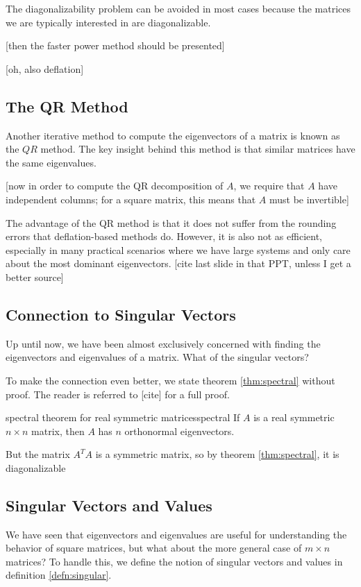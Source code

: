 \documentclass{article}
\begin{document}
The diagonalizability problem can be avoided in most cases because the matrices we are typically interested in are diagonalizable.

[then the faster power method should be presented]

[oh, also deflation]

\subsection{The QR Method}
Another iterative method to compute the eigenvectors of a matrix is known as the $QR$ method. The key insight behind this method is that similar matrices have the same eigenvalues.

[now in order to compute the QR decomposition of $A$, we require that $A$ have independent columns; for a square matrix, this means that $A$ must be invertible]

The advantage of the QR method is that it does not suffer from the rounding errors that deflation-based methods do. However, it is also not as efficient, especially in many practical scenarios where we have large systems and only care about the most dominant eigenvectors. [cite last slide in that PPT, unless I get a better source]

\subsection{Connection to Singular Vectors}
Up until now, we have been almost exclusively concerned with finding the eigenvectors and eigenvalues of a matrix. What of the singular vectors?

To make the connection even better, we state theorem \ref{thm:spectral} without proof. The reader is referred to [cite] for a full proof.

\begin{theorem}{spectral theorem for real symmetric matrices}{spectral}
  If $A$ is a real symmetric $n \times n$ matrix, then $A$ has $n$ orthonormal eigenvectors.
\end{theorem}

But the matrix $A^TA$ is a symmetric matrix, so by theorem \ref{thm:spectral}, it is diagonalizable

\subsection{Singular Vectors and Values}
We have seen that eigenvectors and eigenvalues are useful for understanding the behavior of square matrices, but what about the more general case of $m \times n$ matrices? To handle this, we define the notion of singular vectors and values in definition \ref{defn:singular}.
\end{document}
